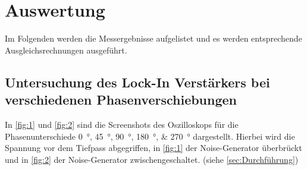 \section{Auswertung}
\label{sec:Auswertung}



Im Folgenden werden die Messergebnisse aufgelistet und es werden entsprechende Ausgleichsrechnungen ausgeführt.

\subsection{Untersuchung des Lock-In Verstärkers bei verschiedenen Phasenverschiebungen}

In \autoref{fig:1} und \autoref{fig:2} sind die Screenshots des Oszilloskops für die Phasenunterschiede \SIlist{0;45;90;180;270}{\degree} dargestellt.
Hierbei wird die Spannung vor dem Tiefpass abgegriffen, in \autoref{fig:1} der Noise-Generator überbrückt und in \autoref{fig:2} der Noise-Generator zwischengeschaltet. (siehe \autoref{sec:Durchführung})

